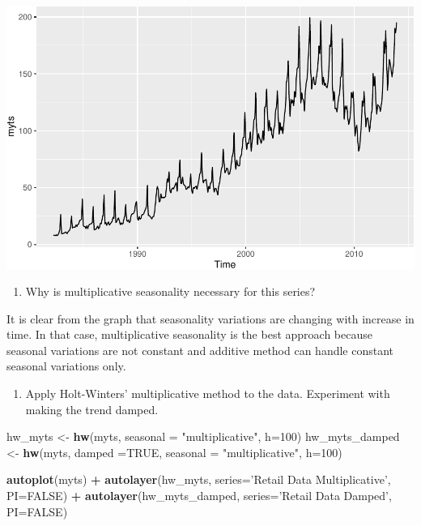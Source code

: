 \documentclass[]{article}
\newenvironment{Shaded}{\begin{snugshade}}{\end{snugshade}}
\newcommand{\KeywordTok}[1]{\textcolor[rgb]{0.13,0.29,0.53}{\textbf{#1}}}
\newcommand{\DataTypeTok}[1]{\textcolor[rgb]{0.13,0.29,0.53}{#1}}
\newcommand{\DecValTok}[1]{\textcolor[rgb]{0.00,0.00,0.81}{#1}}
\newcommand{\StringTok}[1]{\textcolor[rgb]{0.31,0.60,0.02}{#1}}
\newcommand{\OtherTok}[1]{\textcolor[rgb]{0.56,0.35,0.01}{#1}}
\newcommand{\OperatorTok}[1]{\textcolor[rgb]{0.81,0.36,0.00}{\textbf{#1}}}
\newcommand{\NormalTok}[1]{#1}
\providecommand{\tightlist}{%
  \setlength{\itemsep}{0pt}\setlength{\parskip}{0pt}}
\begin{document}
\includegraphics{Hw4_files/figure-latex/unnamed-chunk-18-1.pdf}

\begin{enumerate}
\def\labelenumi{\alph{enumi})}
\tightlist
\item
  Why is multiplicative seasonality necessary for this series?
\end{enumerate}

It is clear from the graph that seasonality variations are changing with
increase in time. In that case, multiplicative seasonality is the best
approach because seasonal variations are not constant and additive
method can handle constant seasonal variations only.

\begin{enumerate}
\def\labelenumi{\alph{enumi})}
\setcounter{enumi}{1}
\tightlist
\item
  Apply Holt-Winters' multiplicative method to the data. Experiment with
  making the trend damped.
\end{enumerate}

\begin{Shaded}
\begin{Highlighting}[]
\NormalTok{hw_myts <-}\StringTok{ }\KeywordTok{hw}\NormalTok{(myts, }\DataTypeTok{seasonal =} \StringTok{"multiplicative"}\NormalTok{, }\DataTypeTok{h=}\DecValTok{100}\NormalTok{)}
\NormalTok{hw_myts_damped  <-}\StringTok{ }\KeywordTok{hw}\NormalTok{(myts, }\DataTypeTok{damped =}\OtherTok{TRUE}\NormalTok{, }\DataTypeTok{seasonal =} \StringTok{"multiplicative"}\NormalTok{, }\DataTypeTok{h=}\DecValTok{100}\NormalTok{)}

\KeywordTok{autoplot}\NormalTok{(myts) }\OperatorTok{+}\StringTok{ }\KeywordTok{autolayer}\NormalTok{(hw_myts, }\DataTypeTok{series=}\StringTok{'Retail Data Multiplicative'}\NormalTok{, }\DataTypeTok{PI=}\OtherTok{FALSE}\NormalTok{)  }\OperatorTok{+}
\StringTok{    }\KeywordTok{autolayer}\NormalTok{(hw_myts_damped, }\DataTypeTok{series=}\StringTok{'Retail Data Damped'}\NormalTok{, }\DataTypeTok{PI=}\OtherTok{FALSE}\NormalTok{) }
\end{Highlighting}
\end{Shaded}
\end{document}
